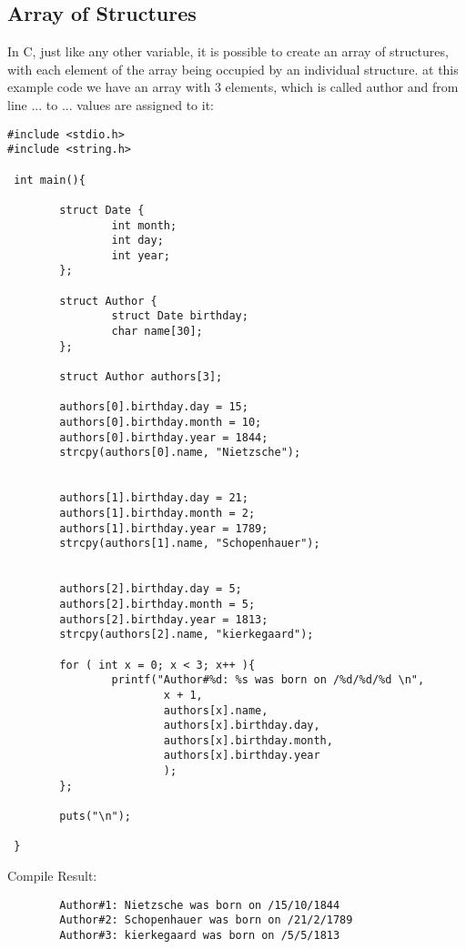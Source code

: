 \subsection{Array of Structures}
In C, just like any other variable, it is possible to create an array of structures, 
with each element of the array being occupied by an individual structure.
at this example code we have an array with 3 elements, which is called author and from line ... to ... 
values are assigned to it:  
\begin{lstlisting}
#include <stdio.h>
#include <string.h>

 int main(){

        struct Date {
                int month;
                int day;
                int year;
        };
       
        struct Author {
                struct Date birthday;
                char name[30];
        };
       
        struct Author authors[3];
       
        authors[0].birthday.day = 15;
        authors[0].birthday.month = 10;
        authors[0].birthday.year = 1844;
        strcpy(authors[0].name, "Nietzsche");


        authors[1].birthday.day = 21;
        authors[1].birthday.month = 2;
        authors[1].birthday.year = 1789;
        strcpy(authors[1].name, "Schopenhauer");


        authors[2].birthday.day = 5;
        authors[2].birthday.month = 5;
        authors[2].birthday.year = 1813;
        strcpy(authors[2].name, "kierkegaard");

        for ( int x = 0; x < 3; x++ ){
                printf("Author#%d: %s was born on /%d/%d/%d \n",
                        x + 1,
                        authors[x].name,
                        authors[x].birthday.day,
                        authors[x].birthday.month,
                        authors[x].birthday.year
                        );
        };

        puts("\n");

 }
\end{lstlisting}

Compile Result:
\begin{lstlisting}
        Author#1: Nietzsche was born on /15/10/1844
        Author#2: Schopenhauer was born on /21/2/1789
        Author#3: kierkegaard was born on /5/5/1813
\end{lstlisting}

